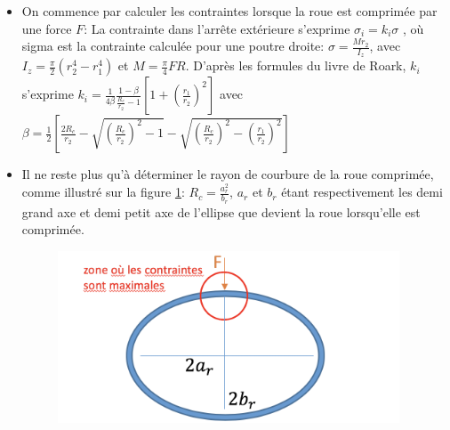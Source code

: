 \begin{itemize}
    \item On commence par calculer les contraintes lorsque la roue est comprimée par une force $F$: La contrainte dans l'arrête extérieure s'exprime $\sigma_i=k_i\sigma$ \cite{roark},
    où sigma est la contrainte calculée pour une poutre droite: $\sigma=\frac{Mr_2}{I_z}$, avec $I_z=\frac{\pi}{2}(r_2^4-r_1^4)$ et $M=\frac{\pi}{4}FR$.
    D'après les formules du livre de Roark, $k_i$ s'exprime $k_i=\frac{1}{4\beta}\frac{1-\beta}{\frac{R_c}{r_2}-1}[1+(\frac{r_1}{r_2})^2]$ avec $\beta=\frac{1}{2}[\frac{2R_c}{r_2}-\sqrt{(\frac{R_c}{r_2})^2-1}-\sqrt{(\frac{R_c}{r_2})^2-(\frac{r_1}{r_2})^2}]$ 
    \item Il ne reste plus qu'à déterminer le rayon de courbure de la roue comprimée, comme illustré sur la figure \ref{fig:ellr}: $R_c=\frac{a_r^2}{b_r}$, $a_r$ et $b_r$ étant respectivement les demi grand axe et demi petit axe de l'ellipse que devient la roue lorsqu'elle est comprimée.\\
    
    \begin{figure}[htb]
    \centering
    \includegraphics[width=4in]{images_2ddl/ellr.png}
    \caption{}
    \label{fig:ellr}
    \end{figure}
    

\end{itemize}
